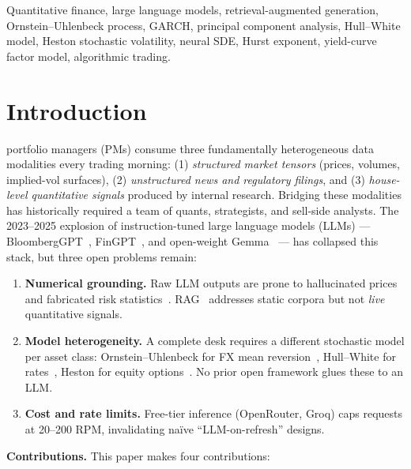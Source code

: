 \documentclass[conference]{IEEEtran}
\begin{document}
\begin{IEEEkeywords}
Quantitative finance, large language models, retrieval-augmented generation, Ornstein--Uhlenbeck process, GARCH, principal component analysis, Hull--White model, Heston stochastic volatility, neural SDE, Hurst exponent, yield-curve factor model, algorithmic trading.
\end{IEEEkeywords}

\section{Introduction}
\label{sec:intro}
 portfolio managers (PMs) consume three fundamentally heterogeneous data modalities every trading morning: (1) \textit{structured market tensors} (prices, volumes, implied-vol surfaces), (2) \textit{unstructured news and regulatory filings}, and (3) \textit{house-level quantitative signals} produced by internal research. Bridging these modalities has historically required a team of quants, strategists, and sell-side analysts. The 2023--2025 explosion of instruction-tuned large language models (LLMs) --- BloombergGPT~\cite{wu2023bloomberggpt}, FinGPT~\cite{yang2023fingpt}, and open-weight Gemma~\cite{gemma2024technical} --- has collapsed this stack, but three open problems remain:

\begin{enumerate}
\item \textbf{Numerical grounding.} Raw LLM outputs are prone to hallucinated prices and fabricated risk statistics~\cite{bang2023hallucination}. RAG~\cite{lewis2020rag} addresses static corpora but not \textit{live} quantitative signals.
\item \textbf{Model heterogeneity.} A complete desk requires a different stochastic model per asset class: Ornstein--Uhlenbeck for FX mean reversion~\cite{uhlenbeck1930theory}, Hull--White for rates~\cite{hullwhite1990}, Heston for equity options~\cite{heston1993}. No prior open framework glues these to an LLM.
\item \textbf{Cost and rate limits.} Free-tier inference (OpenRouter, Groq) caps requests at 20--200 RPM, invalidating na\"ive ``LLM-on-refresh'' designs.
\end{enumerate}

\noindent\textbf{Contributions.} This paper makes four contributions:
\end{document}

